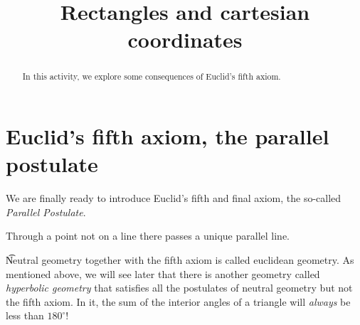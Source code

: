 \documentclass[newpage,hints,handout]{ximera}
\title{Rectangles and cartesian coordinates}
\begin{document}
\begin{abstract}
In this activity, we explore some consequences of Euclid's fifth
axiom.
\end{abstract}
\maketitle

\section*{Euclid's fifth axiom, the parallel postulate}

We are finally ready to introduce Euclid's fifth and final axiom, the
so-called \textit{Parallel Postulate}.

\begin{axiom}
Through a point not on a line there passes a unique parallel line.
\end{axiom}
\t
Neutral geometry together with the fifth axiom is called euclidean
geometry. As mentioned above, we will see later that there is another
geometry called \textit{hyperbolic geometry} that satisfies all the
postulates of neutral geometry but not the fifth axiom. In it, the sum
of the interior angles of a triangle will \textit{always} be less than
$180^\circ$! 
\end{document}

